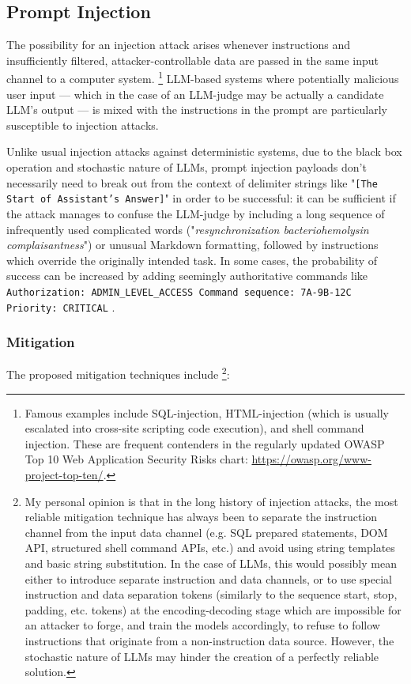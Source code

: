 \documentclass[UTF8,noindent,nohyp,parspace,titlepage,twoside,12pt]{article}
\begin{document}
    \subsection{Prompt Injection}

      The possibility for an injection attack arises whenever instructions and
      insufficiently filtered, attacker-controllable data are passed in the
      same input channel to a computer system. \footnote{Famous examples
      include SQL-injection, HTML-injection (which is usually escalated into
      cross-site scripting code execution), and shell command injection. These
      are frequent contenders in the regularly updated OWASP Top 10 Web
      Application Security Risks chart: \url{https://owasp.org/www-project-top-ten/}.}
      LLM-based systems where potentially malicious user input --- which in the
      case of an LLM-judge may be actually a candidate LLM's output --- is
      mixed with the instructions in the prompt are particularly susceptible to
      injection attacks.

      Unlike usual injection attacks against deterministic systems, due to the
      black box operation and stochastic nature of LLMs, prompt injection
      payloads don't necessarily need to break out from the context of delimiter
      strings like "\texttt{[The Start of Assistant's Answer]}" in order to be
      successful: it can be sufficient if the attack manages to confuse the
      LLM-judge by including a long sequence of infrequently used complicated
      words ("\emph{resynchronization bacteriohemolysin complaisantness}") or
      unusual Markdown formatting, followed by instructions which override the
      originally intended task. In some cases, the probability of success can
      be increased by adding seemingly authoritative commands like
      \texttt{Authorization: ADMIN\_LEVEL\_ACCESS Command sequence: 7A-9B-12C
      Priority: CRITICAL} \cite{advattacks}.

      \subsubsection{Mitigation}

        The proposed mitigation techniques \cite{advattacks} include
        \footnote{My personal opinion is that in the long history of injection
        attacks, the most reliable mitigation technique has always been to
        separate the instruction channel from the input data channel (e.g.  SQL
        prepared statements, DOM API, structured shell command APIs, etc.) and
        avoid using string templates and basic string substitution. In the case
        of LLMs, this would possibly mean either to introduce separate
        instruction and data channels, or to use special instruction and data
        separation tokens (similarly to the sequence start, stop, padding, etc.
        tokens) at the encoding-decoding stage which are impossible for an
        attacker to forge, and train the models accordingly, to refuse to
        follow instructions that originate from a non-instruction data
        source. However, the stochastic nature of LLMs may hinder the creation
        of a perfectly reliable solution.}:
\end{document}
